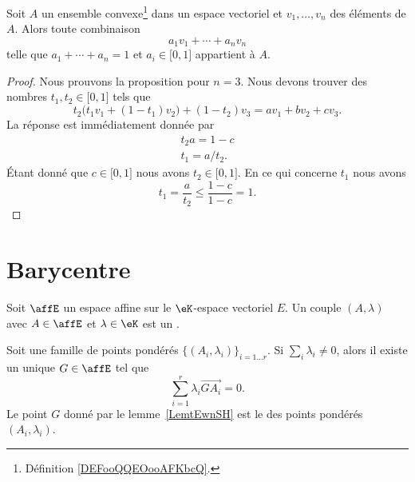 \begin{proposition}     \label{PropPoNpPz}
    Soit \( A\) un ensemble convexe\footnote{Définition \ref{DEFooQQEOooAFKbcQ}.} dans un espace vectoriel et \( v_1,\ldots, v_n\) des éléments de \( A\). Alors toute combinaison
    \begin{equation}
        a_1v_1+\cdots +a_nv_n
    \end{equation}
    telle que \( a_1+\cdots +a_n=1\) et \( a_i\in\mathopen[ 0 , 1 \mathclose]\) appartient à \( A\).
\end{proposition}

\begin{proof}
    Nous prouvons la proposition pour \( n=3\). Nous devons trouver des nombres \( t_1,t_2\in \mathopen[ 0 , 1 \mathclose]\) tels que
    \begin{equation}
        t_2\big( t_1v_1+(1-t_1)v_2 \big)+(1-t_2)v_3=av_1+bv_2+cv_3.
    \end{equation}
    La réponse est immédiatement donnée par
    \begin{subequations}
        \begin{align}
            t_2a=1-c\\
            t_1=a/t_2.
        \end{align}
    \end{subequations}
    Étant donné que \( c\in \mathopen[ 0 , 1 \mathclose]\) nous avons \( t_2\in\mathopen[ 0 , 1 \mathclose]\). En ce qui concerne \( t_1\) nous avons
    \begin{equation}
        t_1=\frac{ a }{ t_2 }\leq \frac{ 1-c }{ 1-c }=1.
    \end{equation}
\end{proof}

\section{Barycentre}

Soit \( \affE\) un espace affine sur le \( \eK\)-espace vectoriel \( E\). Un couple \( (A,\lambda)\) avec \( A\in \affE\) et \( \lambda\in \eK\) est un .

\begin{lemmaDef}        \label{LemtEwnSH}
    Soit une famille de points pondérés \( \{ (A_i,\lambda_i) \}_{i=1\ldots r}\). Si \( \sum_i\lambda_i\neq 0\), alors il existe un unique \( G\in \affE\) tel que
    \begin{equation}
        \sum_{i=1}^r\lambda_i\overrightarrow{ GA_i }=0.
    \end{equation}
    Le point \( G\) donné par le lemme~\ref{LemtEwnSH} est le  des points pondérés \( (A_i,\lambda_i)\).
\end{lemmaDef}


